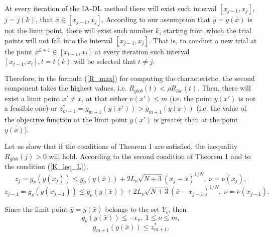 \documentclass[preprint]{elsarticle}
\begin{document}
	At every iteration of the IA-DL method there will exist such interval $[x_{j-1}, x_j]$, $j=j(k)$, that $\bar x \in [x_{j-1}, x_j]$. According to our assumption that $\bar y = y(\bar x)$ is not the limit point, there will exist such number $k$, starting from which the trial points will not fall into the interval $[x_{j-1}, x_j]$. That is, to conduct a new trial at the point $x^{k+1} \in [x_{t-1}, x_t]$ at every iteration such interval $[x_{t-1}, x_t], t=t(k)$ will be selected that $t \neq j$.

	Therefore, in the formula (\ref{R_max}) for computing the characteristic, the second component takes the highest values, i.e. $ R_{glob}(t) < \rho R_{loc}(t)$.
Then, there will exist a limit point $x' \neq \bar x$, at that either $\nu(x') \leq m$ (i.e. the point $y(x')$ is not a feasible one) or $z_{m+1}^\ast =g_{m+1}(y(x'))>g_{m+1}(y(\bar x))$ (i.e. the value of the objective function at the limit point $y(x')$ is greater than at the point $y(\bar x)$).

	Let us show that if the conditions of Theorem 1 are satisfied, the inequality $R_{glob}(j)>0$ will hold. According to the second condition of Theorem 1 and to the condition (\ref{K_leq_L}), 
$$
	z_j=g_{\nu}\left( y(x_j) \right) \leq g_{\nu}\left( y(\bar x) \right) + 2L_{\nu}\sqrt{N+3}(x_j-\bar x)^{1/N}, \; \nu=\nu(x_j),
$$
$$
	z_{j-1}=g_{\nu}\left( y(x_{j-1}) \right) \leq g_{\nu}\left( y(\bar x) \right) + 2L_{\nu}\sqrt{N+3}(\bar x - x_{j-1})^{1/N}, \; \nu=\nu(x_{j-1}).
$$

	Since the limit point $\bar y = y(\bar x)$ belongs to the set $Y_{\epsilon}$, then
$$
	g_{\nu}\left( y(\bar x) \right) \leq -\epsilon_{\nu}, \; 1\leq\nu\leq m,
$$
$$
	g_{m+1}\left( y(\bar x) \right) \leq z_{m+1}^\ast.
$$
\end{document}
